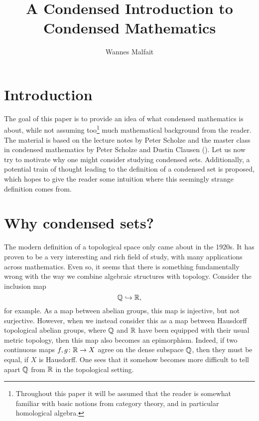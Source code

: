 \documentclass{article}
\title{A Condensed Introduction to Condensed Mathematics}
\author{Wannes Malfait}
\date{}
\begin{document}
\maketitle


\section{Introduction}

The goal of this paper is to provide
an idea of what condensed mathematics is about,
while not assuming too\footnote{
    Throughout this paper it will be assumed that the reader
    is somewhat familiar with basic notions from
    category theory, and in particular homological
    algebra.
} much mathematical background
from the reader.
The material is based on the lecture
notes by Peter Scholze and the master class in
condensed mathematics by
Peter Scholze and Dustin
Clausen (\cite{Sch2019LecturesCM,Sch2020MasterClass}).
Let us now try to motivate why one might
consider studying condensed sets. Additionally,
a potential train of thought leading to the
definition of a condensed set is proposed, which
hopes to give the reader some intuition where
this seemingly strange definition comes from.

\section{Why condensed sets?}

The modern definition of a topological space
only came about in the 1920s. It has proven
to be a very interesting and rich field of study,
with many applications across mathematics. Even so,
it seems that there is something fundamentally wrong
with the way we combine algebraic structures with
topology. Consider the inclusion map
\begin{equation*}
    \mathbb{Q} \hookrightarrow \mathbb{R},
\end{equation*}
for example. As a map between abelian groups,
this map is injective, but not surjective. However,
when we instead consider this as a map between
Hausdorff topological abelian groups, where $\mathbb{Q}$ and $\mathbb{R}$
have been equipped with their usual metric topology,
then this map also becomes an epimorphism. Indeed,
if two continuous maps $f,g\colon \mathbb{R} \to X$ agree
on the dense subspace $\mathbb{Q}$, then they must be equal,
if $X$ is Hausdorff. One sees that it somehow becomes
more difficult to tell apart $\mathbb{Q}$ from $\mathbb{R}$
in the topological setting.
\end{document}
